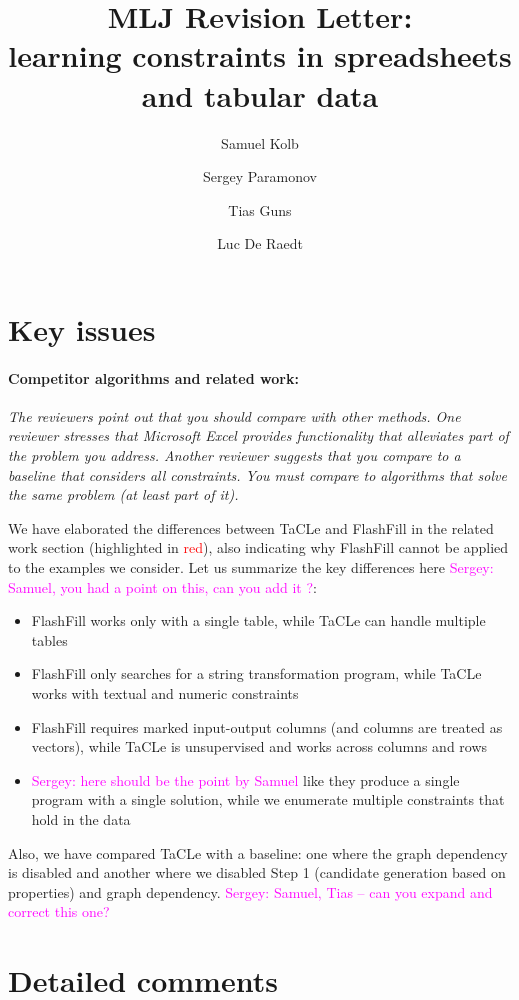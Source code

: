 \documentclass{article}
\author{Samuel Kolb \and Sergey Paramonov \and Tias Guns \and Luc {De Raedt}}
\title{MLJ Revision Letter:\\ learning constraints in spreadsheets and tabular data}
\newcommand{\sergey}[1]{\textcolor{magenta}{{\sc Sergey:} #1}\xspace}
\begin{document}
\maketitle
\section{Key issues}

\paragraph{Competitor algorithms and related work:} \textit{The reviewers point out that you should compare with other methods. One reviewer stresses that Microsoft Excel provides functionality that alleviates part of the problem you address. Another reviewer suggests that you compare to a baseline that considers all constraints. You must compare to algorithms that solve the same problem (at least part of it).}


We have elaborated the differences between TaCLe and FlashFill in the related work section (highlighted in \textcolor{red}{red}), also indicating why FlashFill cannot be applied to the examples we consider. Let us summarize the key differences here \sergey{Samuel, you had a point on this, can you add it ?}:
\begin{itemize}
  \item FlashFill works only with a single table, while TaCLe can handle multiple tables
  \item FlashFill only searches for a string transformation program, while TaCLe works with textual and numeric constraints
  \item FlashFill requires marked input-output columns (and columns are treated as vectors), while TaCLe is unsupervised and works across columns and rows
  \item \sergey{here should be the point by Samuel} like they produce a single program with a single solution, while we enumerate multiple constraints that hold in the data
\end{itemize}


Also, we have compared TaCLe with a baseline: one where the graph dependency is disabled and another where we disabled Step 1 (candidate generation based on properties) and graph dependency. \sergey{Samuel, Tias -- can you expand and correct this one?}

\section{Detailed comments}
\end{document}
